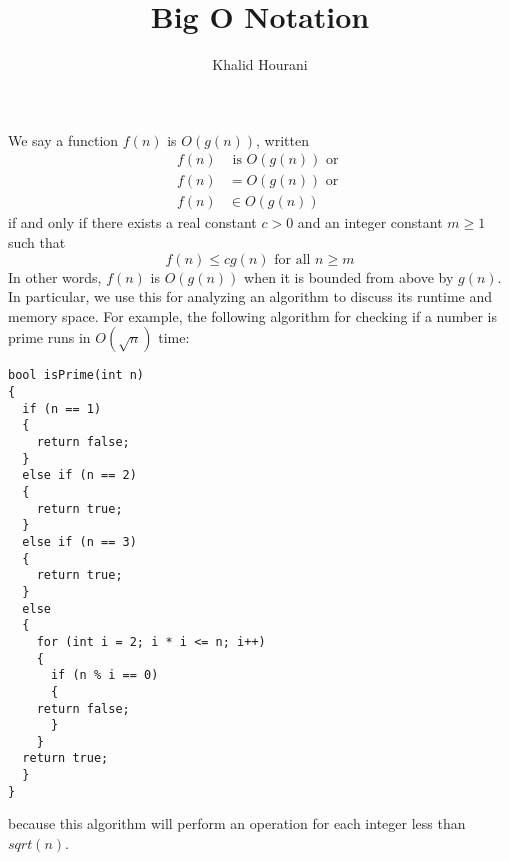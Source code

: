 \documentclass[a4paper]{article}
\title{Big O Notation}
\author{Khalid Hourani}
\begin{document}
\maketitle

We say a function $f(n)$ is $O(g(n))$, written \begin{align*}f(n) &\text{ is } O(g(n))\text{ or }\\f(n)&=O(g(n))\text{ or }\\f(n)&\in O(g(n))\end{align*} if and only if there exists a real constant $c>0$ and an integer constant $m\geq1$ such that \[f(n)\leq cg(n) \text{ for all }n\geq m\] In other words, $f(n)$ is $O(g(n))$ when it is bounded from above by $g(n)$. In particular, we use this for analyzing an algorithm to discuss its runtime and memory space. For example, the following algorithm for checking if a number is prime runs in $O(\sqrt{n})$ time:

\begin{verbatim}
bool isPrime(int n)
{
  if (n == 1)
  {
    return false;
  }
  else if (n == 2)
  {
    return true;
  }
  else if (n == 3)
  {
    return true;
  }
  else
  {
    for (int i = 2; i * i <= n; i++)
    {
      if (n % i == 0)
      {
	return false;
      }
    }
  return true;
  }
}
\end{verbatim}

because this algorithm will perform an operation for each integer less than $sqrt(n)$. 
\end{document}
